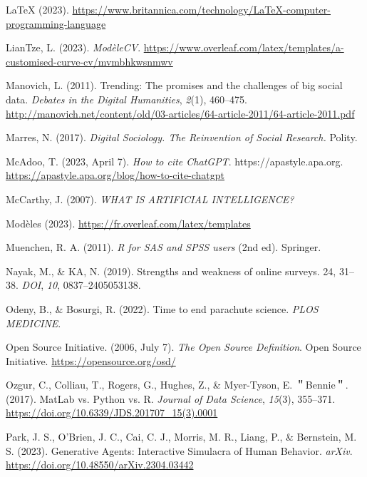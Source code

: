 \documentclass[
  letterpaper,
  DIV=11,
  numbers=noendperiod]{scrreprt}
\newlength{\cslhangindent}
\newenvironment{CSLReferences}[2] %
 {\begin{list}{}{%
  \setlength{\itemindent}{0pt}
  \setlength{\leftmargin}{0pt}
  \setlength{\parsep}{0pt}
  \ifodd #1
   \setlength{\leftmargin}{\cslhangindent}
   \setlength{\itemindent}{-1\cslhangindent}
  \fi
  \setlength{\itemsep}{#2\baselineskip}}}
 {\end{list}}
\begin{document}
\begin{CSLReferences}{1}{0}
{LaTeX} (2023).
\url{https://www.britannica.com/technology/LaTeX-computer-programming-language}

LianTze, L. (2023). \emph{{ModèleCV}}.
\url{https://www.overleaf.com/latex/templates/a-customised-curve-cv/mvmbhkwsnmwv}

Manovich, L. (2011). Trending: {The} promises and the challenges of big
social data. \emph{Debates in the Digital Humanities}, \emph{2}(1),
460--475.
\url{http://manovich.net/content/old/03-articles/64-article-2011/64-article-2011.pdf}

Marres, N. (2017). \emph{Digital {Sociology}. {The Reinvention} of
{Social Research}.} Polity.

McAdoo, T. (2023, April 7). \emph{How to cite {ChatGPT}}.
https://apastyle.apa.org.
\url{https://apastyle.apa.org/blog/how-to-cite-chatgpt}

McCarthy, J. (2007). \emph{{WHAT IS ARTIFICIAL INTELLIGENCE}?}

Modèles (2023). \url{https://fr.overleaf.com/latex/templates}

Muenchen, R. A. (2011). \emph{R for {SAS} and {SPSS} users} (2nd ed).
Springer.

Nayak, M., \& KA, N. (2019). Strengths and weakness of online surveys.
24, 31--38. \emph{DOI}, \emph{10}, 0837--2405053138.

Odeny, B., \& Bosurgi, R. (2022). Time to end parachute science.
\emph{PLOS MEDICINE}.

Open Source Initiative. (2006, July 7). \emph{The {Open Source
Definition}}. Open Source Initiative. \url{https://opensource.org/osd/}

Ozgur, C., Colliau, T., Rogers, G., Hughes, Z., \& Myer-Tyson, E.
＂Bennie＂. (2017). {MatLab} vs. {Python} vs. {R}. \emph{Journal of Data
Science}, \emph{15}(3), 355--371.
\url{https://doi.org/10.6339/JDS.201707_15(3).0001}

Park, J. S., O'Brien, J. C., Cai, C. J., Morris, M. R., Liang, P., \&
Bernstein, M. S. (2023). Generative {Agents}: {Interactive Simulacra} of
{Human Behavior}. \emph{arXiv}.
\url{https://doi.org/10.48550/arXiv.2304.03442}


\end{CSLReferences}
\end{document}
